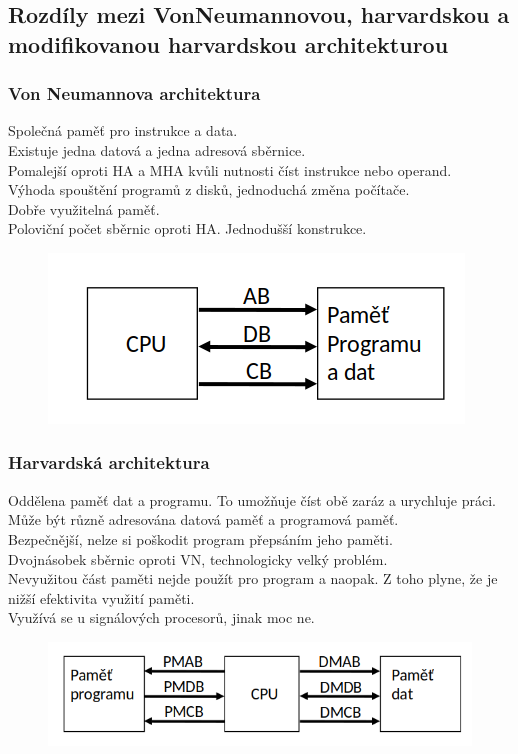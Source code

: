 \subsection{Rozdíly mezi VonNeumannovou, harvardskou a modifikovanou harvardskou architekturou}
\subsubsection*{Von Neumannova architektura}
Společná paměť pro instrukce a data. \\
Existuje jedna datová a jedna adresová sběrnice. \\
Pomalejší oproti HA a MHA kvůli nutnosti číst instrukce nebo operand. \\
Výhoda spouštění programů z disků, jednoduchá změna počítače. \\
Dobře využitelná paměť. \\
Poloviční počet sběrnic oproti HA. Jednodušší konstrukce. \\
\begin{figure}[h!]
    \centering
    \includegraphics[]{img/VNporovnani.png}
\end{figure}

\subsubsection{Harvardská architektura}
Oddělena paměť dat a programu. To umožňuje číst obě zaráz a urychluje práci.\\
Může být různě adresována datová paměť a programová paměť.\\
Bezpečnější, nelze si poškodit program přepsáním jeho paměti.\\
Dvojnásobek sběrnic oproti VN, technologicky velký problém. \\
Nevyužitou část paměti nejde použít pro program a naopak. Z toho plyne, že je nižší efektivita využití paměti. \\
Využívá se u signálových procesorů, jinak moc ne.\\
\begin{figure}[h!]
    \centering
    \includegraphics[width = \textwidth]{img/HAporovnani.png}
\end{figure}

